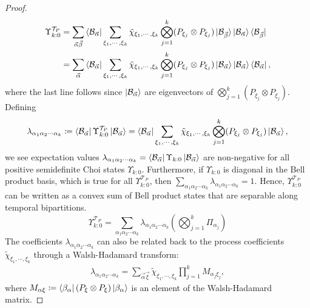 \begin{proof}
\begin{equation}
    \begin{split}
    \Upsilon_{k:0}^{\mathcal{T}_P} &= \sum_{{\vec{\alpha}}{\vec{\beta}}} \bra{\mathcal{B}_{\vec{\alpha}}} \sum_{\xi_1,\cdots,\xi_k} \tilde{\chi}_{\xi_1,\cdots,\xi_k} \bigotimes_{j=1}^{k}(P_{\xi_j}\otimes P_{\xi_j})\ket{\mathcal{B}_{\vec{\beta}}} \ket{\mathcal{B}_{\vec{\alpha}}}\bra{\mathcal{B}_{\vec{\beta}}} \\ 
    &= \sum_{{\vec{\alpha}}} \bra{\mathcal{B}_{\vec{\alpha}}} \sum_{\xi_1,\cdots,\xi_k} \tilde{\chi}_{\xi_1,\cdots,\xi_k} \bigotimes_{j=1}^{k}(P_{\xi_j}\otimes P_{\xi_j})\ket{\mathcal{B}_{\vec{\alpha}}} \ket{\mathcal{B}_{\vec{\alpha}}}\bra{\mathcal{B}_{\vec{\alpha}}},
    \end{split}
\end{equation}
where the last line follows since \(\ket{\mathcal{B}_{\vec{\alpha}}}\) are eigenvectors of \(\bigotimes_{j=1}^{k}(P_{\xi_j}\otimes P_{\xi_j})\). Defining
\begin{equation}
    \lambda_{\alpha_1\alpha_2\cdots\alpha_k} \coloneq \bra{\mathcal{B}_{\vec{\alpha}}} \Upsilon_{k:0}^{\mathcal{T}_P} \ket{\mathcal{B}_{\vec{\alpha}}} = \bra{\mathcal{B}_{\vec{\alpha}}} \sum_{\xi_1,\cdots,\xi_k} \tilde{\chi}_{\xi_1,\cdots,\xi_k} \bigotimes_{j=1}^{k}(P_{\xi_j}\otimes P_{\xi_j})\ket{\mathcal{B}_{\vec{\alpha}}},
\end{equation}
we see expectation values \(\lambda_{\alpha_1\alpha_2\cdots\alpha_k} = \bra{\mathcal{B}_{\vec{\alpha}}} \Upsilon_{k:0} \ket{\mathcal{B}_{\vec{\alpha}}}\) are non-negative for all positive semidefinite Choi states \(\Upsilon_{k:0}\). Furthermore, if \(\Upsilon_{k:0}\) is diagonal in the Bell product basis, which is true for all \(\Upsilon_{k:0}^{\mathcal{T}_P}\), then \(\sum_{\alpha_1\alpha_2\cdots\alpha_k}\lambda_{\alpha_1\alpha_2\cdots\alpha_k} = 1\). Hence, \(\Upsilon_{k:0}^{\mathcal{T}_P}\) can be written as a convex sum of Bell product states that are separable along temporal bipartitions.
\begin{equation}\label{eq:ppt-bell-basis}
    \Upsilon_{k:0}^{\mathcal{T}_P} = \sum_{\alpha_1\alpha_2\cdots\alpha_k}\lambda_{\alpha_1\alpha_2\cdots\alpha_k}\left(\bigotimes_{j=1}^k\Pi_{\alpha_j}\right)
\end{equation}
The coefficients \(\lambda_{\alpha_1\alpha_2\cdots\alpha_k}\) can also be related back to the process coefficients \(\tilde{\chi}_{\xi_1,\cdots,\xi_k}\) through a Walsh-Hadamard transform:
\begin{equation}
    \begin{split}
        \lambda_{\alpha_1\alpha_2\cdots\alpha_k} = \sum_{\vec{\alpha}\vec{\xi}} \tilde{\chi}_{\xi_1,\cdots,\xi_k}\prod_{j=1}^k M_{\alpha_j\xi_j},
    \end{split}
\end{equation}
where \(M_{\alpha\xi} \coloneq \bra{\beta_\alpha}(P_\xi\otimes P_\xi)\ket{\beta_\alpha}\) is an element of the Walsh-Hadamard matrix.
\end{proof}